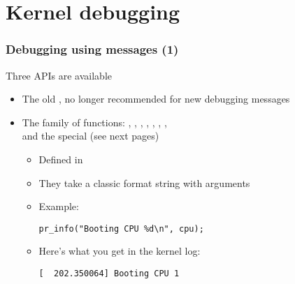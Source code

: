 \section{Kernel debugging}

\begin{frame}[fragile]
  \frametitle{Debugging using messages (1)}
  Three APIs are available
  \begin{itemize}
  \item The old , no longer recommended for new debugging
    messages
  \item The  family of functions: ,
    , , ,
    , , ,
     \\
    and the special  (see next pages)
    \begin{itemize}
    \item Defined in 
    \item They take a classic format string with arguments
    \item Example:
      \begin{verbatim}
pr_info("Booting CPU %d\n", cpu);
      \end{verbatim}
    \item Here's what you get in the kernel log:
      \begin{verbatim}
[  202.350064] Booting CPU 1
      \end{verbatim}
    \end{itemize}
  \end{itemize}
\end{frame}


